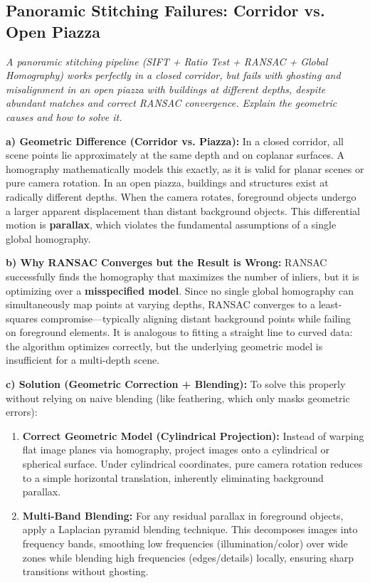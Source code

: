 \subsection[Question -- {\it Panoramic Stitching Failures and Parallax}]{}

\subsection{Panoramic Stitching Failures: Corridor vs. Open Piazza}
\textit{A panoramic stitching pipeline (SIFT + Ratio Test + RANSAC + Global Homography) works perfectly in a closed corridor, but fails with ghosting and misalignment in an open piazza with buildings at different depths, despite abundant matches and correct RANSAC convergence. Explain the geometric causes and how to solve it.}

\textbf{a) Geometric Difference (Corridor vs. Piazza):}
In a closed corridor, all scene points lie approximately at the same depth and on coplanar surfaces. A homography mathematically models this exactly, as it is valid for planar scenes or pure camera rotation. In an open piazza, buildings and structures exist at radically different depths. When the camera rotates, foreground objects undergo a larger apparent displacement than distant background objects. This differential motion is \textbf{parallax}, which violates the fundamental assumptions of a single global homography.

\textbf{b) Why RANSAC Converges but the Result is Wrong:}
RANSAC successfully finds the homography that maximizes the number of inliers, but it is optimizing over a \textbf{misspecified model}. Since no single global homography can simultaneously map points at varying depths, RANSAC converges to a least-squares compromise---typically aligning distant background points while failing on foreground elements. It is analogous to fitting a straight line to curved data: the algorithm optimizes correctly, but the underlying geometric model is insufficient for a multi-depth scene.

\textbf{c) Solution (Geometric Correction + Blending):}
To solve this properly without relying on naive blending (like feathering, which only masks geometric errors):
\begin{enumerate}
    \item \textbf{Correct Geometric Model (Cylindrical Projection):} Instead of warping flat image planes via homography, project images onto a cylindrical or spherical surface. Under cylindrical coordinates, pure camera rotation reduces to a simple horizontal translation, inherently eliminating background parallax.
    \item \textbf{Multi-Band Blending:} For any residual parallax in foreground objects, apply a Laplacian pyramid blending technique. This decomposes images into frequency bands, smoothing low frequencies (illumination/color) over wide zones while blending high frequencies (edges/details) locally, ensuring sharp transitions without ghosting.
\end{enumerate}

